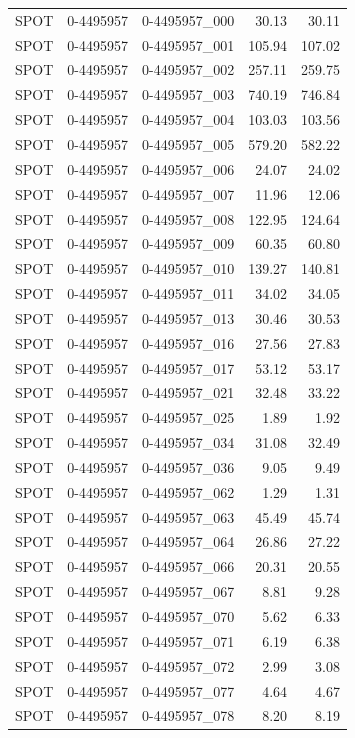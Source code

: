 \begin{tabular}{lllrr}
SPOT & 0-4495957 & 0-4495957_000 & 30.13 & 30.11 \\
SPOT & 0-4495957 & 0-4495957_001 & 105.94 & 107.02 \\
SPOT & 0-4495957 & 0-4495957_002 & 257.11 & 259.75 \\
SPOT & 0-4495957 & 0-4495957_003 & 740.19 & 746.84 \\
SPOT & 0-4495957 & 0-4495957_004 & 103.03 & 103.56 \\
SPOT & 0-4495957 & 0-4495957_005 & 579.20 & 582.22 \\
SPOT & 0-4495957 & 0-4495957_006 & 24.07 & 24.02 \\
SPOT & 0-4495957 & 0-4495957_007 & 11.96 & 12.06 \\
SPOT & 0-4495957 & 0-4495957_008 & 122.95 & 124.64 \\
SPOT & 0-4495957 & 0-4495957_009 & 60.35 & 60.80 \\
SPOT & 0-4495957 & 0-4495957_010 & 139.27 & 140.81 \\
SPOT & 0-4495957 & 0-4495957_011 & 34.02 & 34.05 \\
SPOT & 0-4495957 & 0-4495957_013 & 30.46 & 30.53 \\
SPOT & 0-4495957 & 0-4495957_016 & 27.56 & 27.83 \\
SPOT & 0-4495957 & 0-4495957_017 & 53.12 & 53.17 \\
SPOT & 0-4495957 & 0-4495957_021 & 32.48 & 33.22 \\
SPOT & 0-4495957 & 0-4495957_025 & 1.89 & 1.92 \\
SPOT & 0-4495957 & 0-4495957_034 & 31.08 & 32.49 \\
SPOT & 0-4495957 & 0-4495957_036 & 9.05 & 9.49 \\
SPOT & 0-4495957 & 0-4495957_062 & 1.29 & 1.31 \\
SPOT & 0-4495957 & 0-4495957_063 & 45.49 & 45.74 \\
SPOT & 0-4495957 & 0-4495957_064 & 26.86 & 27.22 \\
SPOT & 0-4495957 & 0-4495957_066 & 20.31 & 20.55 \\
SPOT & 0-4495957 & 0-4495957_067 & 8.81 & 9.28 \\
SPOT & 0-4495957 & 0-4495957_070 & 5.62 & 6.33 \\
SPOT & 0-4495957 & 0-4495957_071 & 6.19 & 6.38 \\
SPOT & 0-4495957 & 0-4495957_072 & 2.99 & 3.08 \\
SPOT & 0-4495957 & 0-4495957_077 & 4.64 & 4.67 \\
SPOT & 0-4495957 & 0-4495957_078 & 8.20 & 8.19 \\

\end{tabular}
